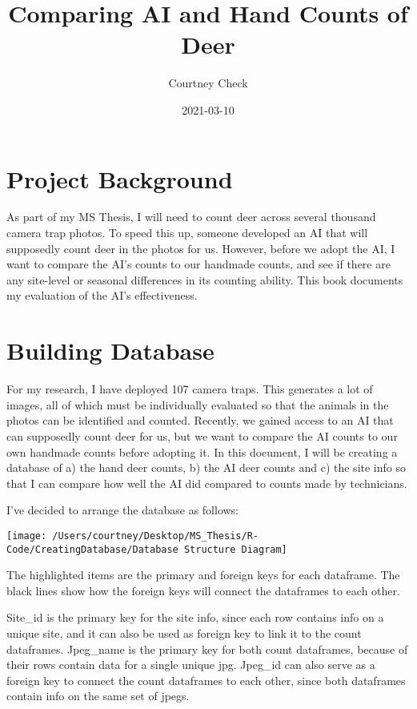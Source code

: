 \documentclass[
]{book}
\title{Comparing AI and Hand Counts of Deer}
\author{Courtney Check}
\date{2021-03-10}
\begin{document}
\maketitle

{
\setcounter{tocdepth}{1}
\tableofcontents
}
\hypertarget{project-background}{%
\chapter{Project Background}\label{project-background}}

As part of my MS Thesis, I will need to count deer across several thousand camera trap photos. To speed this up, someone developed an AI that will supposedly count deer in the photos for us. However, before we adopt the AI, I want to compare the AI's counts to our handmade counts, and see if there are any site-level or seasonal differences in its counting ability. This book documents my evaluation of the AI's effectiveness.

\hypertarget{building-database}{%
\chapter{Building Database}\label{building-database}}

For my research, I have deployed 107 camera traps. This generates a lot of images, all of which must be individually evaluated so that the animals in the photos can be identified and counted. Recently, we gained access to an AI that can supposedly count deer for us, but we want to compare the AI counts to our own handmade counts before adopting it. In this document, I will be creating a database of a) the hand deer counts, b) the AI deer counts and c) the site info so that I can compare how well the AI did compared to counts made by technicians.

I've decided to arrange the database as follows:

\begin{center}\texttt{[image: /Users/courtney/Desktop/MS\_Thesis/R-Code/CreatingDatabase/Database Structure Diagram]} \end{center}

The highlighted items are the primary and foreign keys for each dataframe. The black lines show how the foreign keys will connect the dataframes to each other.

Site\_id is the primary key for the site info, since each row contains info on a unique site, and it can also be used as foreign key to link it to the count dataframes. Jpeg\_name is the primary key for both count dataframes, because of their rows contain data for a single unique jpg. Jpeg\_id can also serve as a foreign key to connect the count dataframes to each other, since both dataframes contain info on the same set of jpegs.
\end{document}
